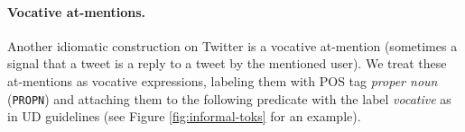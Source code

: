 \documentclass[11pt,a4paper]{article}
\newcommand{\yjcomment}[1]{\textcolor{orange}{[$_\mathrm{L}^\mathrm{Y}$#1]}}
\newcommand{\yicomment}[1]{\textcolor{gray}{[#1 ---\textsc{Yi}]}}
\begin{document}

\paragraph{Vocative at-mentions.}  Another idiomatic construction on
Twitter is a vocative at-mention (sometimes a
signal that a tweet is a reply to a tweet by the mentioned user). %
We
treat these at-mentions as vocative expressions, labeling them with
POS tag
\emph{proper noun} (\texttt{PROPN}) and attaching them to the
following predicate with the label \emph{vocative} as in UD guidelines (see Figure \ref{fig:informal-toks} for an example).

\end{document}
